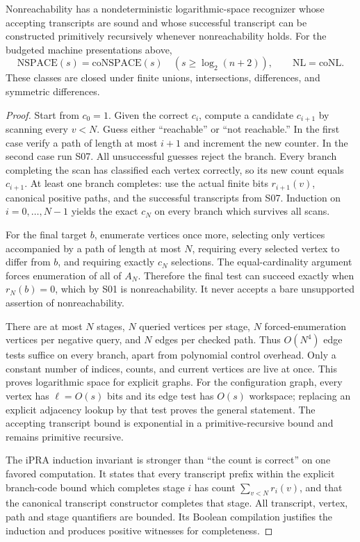 \begin{theorem}
\label{thm:S08}
Nonreachability has a nondeterministic logarithmic-space recognizer whose
accepting transcripts are sound and whose successful transcript can be
constructed primitively recursively whenever nonreachability holds.
For the budgeted machine presentations above,
\[
 \mathrm{NSPACE}(s)=\mathrm{coNSPACE}(s)
 \quad(s\geq\log_2(n+2)),
 \qquad \mathrm{NL}=\mathrm{coNL}.
\]
These classes are closed under finite unions, intersections, differences,
and symmetric differences.
\end{theorem}
\begin{proof}
Start from $c_0=1$.  Given the correct $c_i$, compute a candidate
$c_{i+1}$ by scanning every $v<N$.  Guess either ``reachable'' or
``not reachable.''  In the first case verify a path of length at most
$i+1$ and increment the new counter.  In the second case run S07.
All unsuccessful guesses reject the branch.  Every branch completing
the scan has classified each vertex correctly, so its new count equals
$c_{i+1}$.  At least one branch completes: use the actual finite bits
$r_{i+1}(v)$, canonical positive paths, and the successful transcripts
from S07.  Induction on $i=0,\ldots,N-1$ yields the exact $c_N$ on
every branch which survives all scans.

For the final target $b$, enumerate vertices once more, selecting only
vertices accompanied by a path of length at most $N$, requiring every
selected vertex to differ from $b$, and requiring exactly $c_N$
selections.  The equal-cardinality argument forces enumeration of all
of $A_N$.  Therefore the final test can succeed exactly when
$r_N(b)=0$, which by S01 is nonreachability.  It never accepts a bare
unsupported assertion of nonreachability.

There are at most $N$ stages, $N$ queried vertices per stage, $N$
forced-enumeration vertices per negative query, and $N$ edges per checked
path.  Thus $O(N^4)$ edge tests suffice on every branch, apart from
polynomial control overhead.  Only a constant number of indices, counts,
and current vertices are live at once.  This proves logarithmic space
for explicit graphs.  For the configuration graph, every vertex has
$\ell=O(s)$ bits and its edge test has $O(s)$ workspace; replacing an
explicit adjacency lookup by that test proves the general statement.
The accepting transcript bound is exponential in a primitive-recursive
bound and remains primitive recursive.

The iPRA induction invariant is stronger than ``the count is correct''
on one favored computation.  It states that every transcript prefix
within the explicit branch-code bound which completes stage $i$ has
count $\sum_{v<N}r_i(v)$, and that the canonical transcript constructor
completes that stage.  All transcript, vertex, path and stage quantifiers
are bounded.  Its Boolean compilation justifies the induction and
produces positive witnesses for completeness.


\end{proof}
